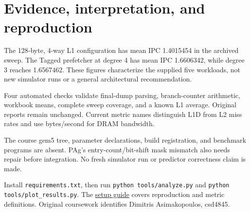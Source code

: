 \documentclass[10pt,a4paper]{article}
\begin{document}
\section*{Evidence, interpretation, and reproduction}
The 128-byte, 4-way L1 configuration has mean IPC 1.4015454 in the archived sweep. The Tagged prefetcher at degree 4 has mean IPC 1.6606342, while degree 3 reaches 1.6567462. These figures characterize the supplied five workloads, not new simulator runs or a general architectural recommendation.

Four automated checks validate final-dump parsing, branch-counter arithmetic, workbook means, complete sweep coverage, and a known L1 average. Original reports remain unchanged. Current metric names distinguish L1D from L2 miss rates and use bytes/second for DRAM bandwidth.

The course gem5 tree, parameter declarations, build registration, and benchmark programs are absent. PAg's entry-count/bit-shift mask mismatch also needs repair before integration. No fresh simulator run or predictor correctness claim is made.

Install \texttt{requirements.txt}, then run \texttt{python tools/analyze.py} and \texttt{python tools/plot\_results.py}. The \href{https://github.com/mitsosasim/computer_architecture/blob/main/docs/SETUP.md}{setup guide} covers reproduction and metric definitions. Original coursework identifies Dimitris Asimakopoulos, csd4845.
\end{document}
